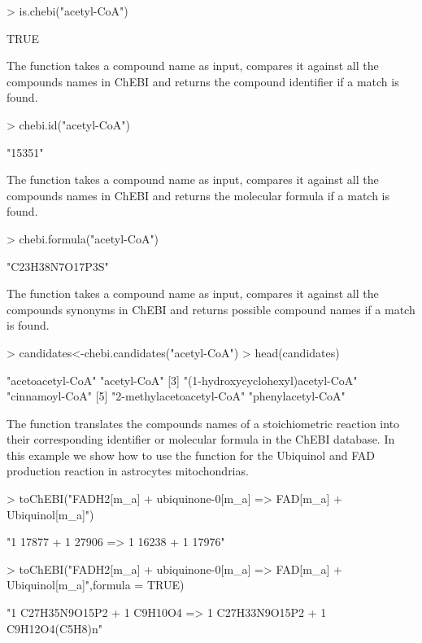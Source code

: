 \begin{Schunk}
\begin{Sinput}
> is.chebi("acetyl-CoA")
\end{Sinput}
\begin{Soutput}
[1] TRUE
\end{Soutput}
The  function takes a compound name as input, compares it against all the compounds names in ChEBI and returns the compound identifier if a match is found.
\begin{Sinput}
> chebi.id("acetyl-CoA")
\end{Sinput}
\begin{Soutput}
[1] "15351"
\end{Soutput}
The  function takes a compound name as input, compares it against all the compounds names in ChEBI and returns the molecular formula if a match is found.
\begin{Sinput}
> chebi.formula("acetyl-CoA")
\end{Sinput}
\begin{Soutput}
[1] "C23H38N7O17P3S"
\end{Soutput}
The  function takes a compound name as input, compares it against all the compounds synonyms in ChEBI and returns possible compound names if a match is found.
\begin{Sinput}
> candidates<-chebi.candidates("acetyl-CoA")
> head(candidates)
\end{Sinput}
\begin{Soutput}
[1] "acetoacetyl-CoA"                 "acetyl-CoA"                     
[3] "(1-hydroxycyclohexyl)acetyl-CoA" "cinnamoyl-CoA"                  
[5] "2-methylacetoacetyl-CoA"         "phenylacetyl-CoA"               
\end{Soutput}
The  function translates the compounds names of a stoichiometric reaction into their corresponding identifier or molecular formula in the ChEBI database. In this example we show how to use the  function for the Ubiquinol and FAD production reaction in astrocytes mitochondrias.
\begin{Sinput}
> toChEBI("FADH2[m_a] + ubiquinone-0[m_a] => FAD[m_a] + Ubiquinol[m_a]")
\end{Sinput}
\begin{Soutput}
[1] "1 17877 + 1 27906 => 1 16238 + 1 17976"
\end{Soutput}
\begin{Sinput}
> toChEBI("FADH2[m_a] + ubiquinone-0[m_a] => FAD[m_a] + Ubiquinol[m_a]",formula = TRUE)
\end{Sinput}
\begin{Soutput}
[1] "1 C27H35N9O15P2 + 1 C9H10O4 => 1 C27H33N9O15P2 + 1 C9H12O4(C5H8)n"
\end{Soutput}
\end{Schunk}
